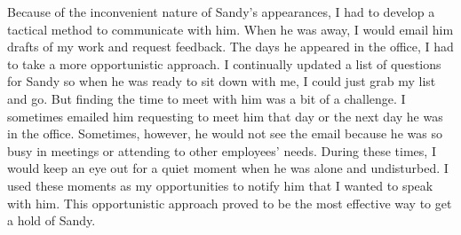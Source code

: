 
Because of the inconvenient nature of Sandy's appearances, I had to develop a tactical method to communicate with him.
When he was away, I would email him drafts of my work and request feedback.
The days he appeared in the office, I had to take a more opportunistic 
approach.
I continually updated a list of questions for Sandy so when he was ready to sit down with me, I could just grab my list and go.
But finding the time to meet with him was a bit of a challenge.
I sometimes emailed him requesting to meet him that day or the next day he was in the office.
Sometimes, however, he would not see the email because he was so busy in meetings or attending to other employees' needs.
During these times, I would keep an eye out for a quiet moment when he was alone and undisturbed.
I used these moments as my opportunities to notify him that I wanted to speak with him.
This opportunistic approach proved to be the most effective way to get a hold of Sandy.

\begin{comment}
Figure \ref{fig:J+S_Meetings} shows the number of meetings I managed to arrange with Joan and Sandy since my second week at Sunamp (when I had properly begun my project).
The data comes from my Sunamp log (\hl{see Appendix ...}); it is possible that I had more meetings with them than I recorded.
Overall, I had between one and three meetings a week with Joan and Sandy.
There is a decreasing trend of the number of meetings, but the main reason for this is Joan's and Sandy's absences in Weeks 4 and 6.
Considering that Joan was absent during most of Week 4 and all of Week 6, I typically met with her twice a week.
Considering that Sandy may have been absent in Week 4, I met with him on average once a week.
This shows that Joan was more readily available than Sandy.


\begin{figure}[htbp]
\centering
\texttt{[image: figures/J+S\_Meetings.png]}
\rule{\textwidth}{0.5pt} %
\caption{A chart displaying the number of meetings I arranged with Joan and Sandy at Sunamp.}
\label{fig:J+S_Meetings}
\end{figure}
\end{comment}

